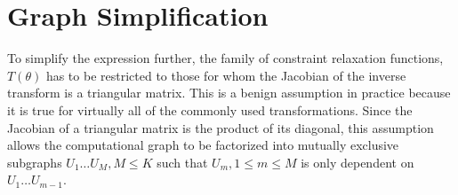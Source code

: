 \documentclass[10pt]{article}
\begin{document}
\section*{Graph Simplification}

To simplify the expression further, the family of constraint relaxation functions, $T(\theta)$ has to be restricted to those
for whom the Jacobian of the inverse transform is a triangular matrix. This is a benign assumption in practice because it is
true for virtually all of the commonly used transformations. Since the Jacobian of a triangular matrix is the product of 
its diagonal, this assumption allows the computational graph to be factorized into mutually exclusive subgraphs $U_1 \ldots U_M, M \leq K$
such that $U_m, 1 \le m \leq M$ is only dependent on $U_1 \ldots U_{m - 1}$. 
\end{document}

